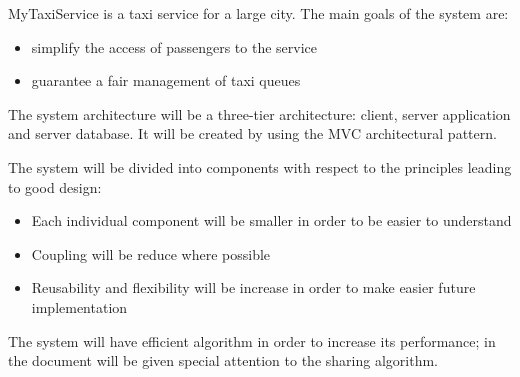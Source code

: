  
MyTaxiService is a taxi service for a large city.
The main goals of the system are: 

\begin{itemize} 
	\item simplify the access of passengers to the service
	\item guarantee a fair management of taxi queues
\end{itemize}

The system architecture will be a three-tier architecture: client, server application and server database. It will be created by using the MVC architectural pattern.

The system will be divided into components with respect to the principles leading to good design:
\begin{itemize}
	\item Each individual component will be smaller in order to be easier to understand
	\item Coupling will be reduce where possible
	\item Reusability and flexibility will be increase in order to make easier future implementation
\end{itemize}

The system will have efficient algorithm in order to increase its performance; 
in the document will be given special attention to the sharing algorithm.
